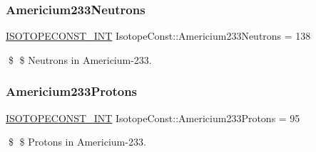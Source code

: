 \subsubsection{\texorpdfstring{Americium233\+Neutrons}{Americium233Neutrons}}
{\footnotesize\ttfamily \mbox{\hyperlink{group___isotope_const-_macros_ga5f18360b3e99483a35c32d789e62621c}{I\+S\+O\+T\+O\+P\+E\+C\+O\+N\+S\+T\+\_\+\+I\+NT}} Isotope\+Const\+::\+Americium233\+Neutrons = 138}

\$ \$ Neutrons in Americium-\/233. \mbox{\label{group___isotope_const-_americium-_am233_ga0ecf591fb3292f89a7dedc437a757d9c}} 
\subsubsection{\texorpdfstring{Americium233\+Protons}{Americium233Protons}}
{\footnotesize\ttfamily \mbox{\hyperlink{group___isotope_const-_macros_ga5f18360b3e99483a35c32d789e62621c}{I\+S\+O\+T\+O\+P\+E\+C\+O\+N\+S\+T\+\_\+\+I\+NT}} Isotope\+Const\+::\+Americium233\+Protons = 95}

\$ \$ Protons in Americium-\/233. 